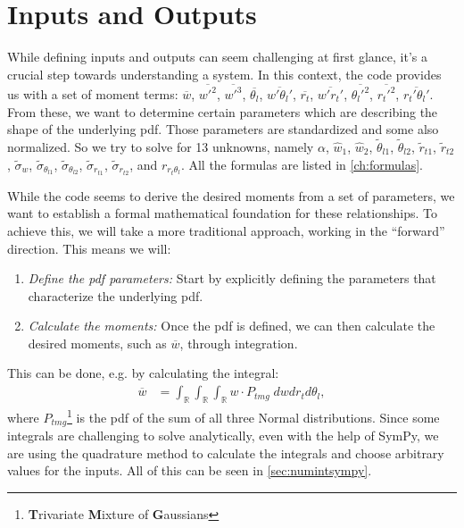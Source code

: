 \section{Inputs and Outputs}\label{sec:inputsandoutputs}

While defining inputs and outputs can seem challenging at first glance, it's a crucial step towards understanding a system.
In this context, the code provides us with a set of moment terms: $\overline{w}$, $\overline{w'^2}$, $\overline{w'^3}$, $\overline{\theta_l}$, $\overline{w'\theta_l'}$, $\overline{r_t}$, $\overline{w' r_t'}$, $\overline{\theta_l'^2}$, $\overline{r_t'^2}$, $\overline{r_t'\theta_l'}$.
From these, we want to determine certain parameters which are describing the shape of the underlying \gls{pdf}.
Those parameters are standardized and some also normalized.
So we try to solve for 13 unknowns, namely $\alpha$, $\widehat{w}_1$, $\widehat{w}_2$, $\tilde{\theta}_{l1}$, $\tilde{\theta}_{l2}$, $\tilde{r}_{t1}$, $\tilde{r}_{t2}$, $\tilde{\sigma}_w$, $\tilde{\sigma}_{\theta_{l1}}$, $\tilde{\sigma}_{\theta_{l2}}$, $\tilde{\sigma}_{r_{t1}}$, $\tilde{\sigma}_{r_{t2}}$, and $r_{r_t \theta_l}$.
All the formulas are listed in \cref{ch:formulas}.

While the code seems to derive the desired moments from a set of parameters, we want to establish a formal mathematical foundation for these relationships.
To achieve this, we will take a more traditional approach, working in the \enquote{forward} direction.
This means we will:
\begin{enumerate}
    \item \emph{Define the \gls{pdf} parameters:}
    Start by explicitly defining the parameters that characterize the underlying \gls{pdf}.
    \item \emph{Calculate the moments:}
    Once the \gls{pdf} is defined, we can then calculate the desired moments, such as $\overline{w}$, through integration.
\end{enumerate}
This can be done, e.g. by calculating the integral:
\begin{align}
    \overline{w}
    &= \int_{\mathbb{R}} \int_{\mathbb{R}} \int_{\mathbb{R}} w \cdot P_{tmg} \; dw dr_t d\theta_l,
\end{align}
where $P_{tmg}$\footnote{\textbf{T}rivariate \textbf{M}ixture of \textbf{G}aussians} is the \gls{pdf} of the sum of all three Normal distributions.
Since some integrals are challenging to solve analytically, even with the help of SymPy, we are using the quadrature method to calculate the integrals and choose arbitrary values for the inputs.
All of this can be seen in \cref{sec:numintsympy}.
